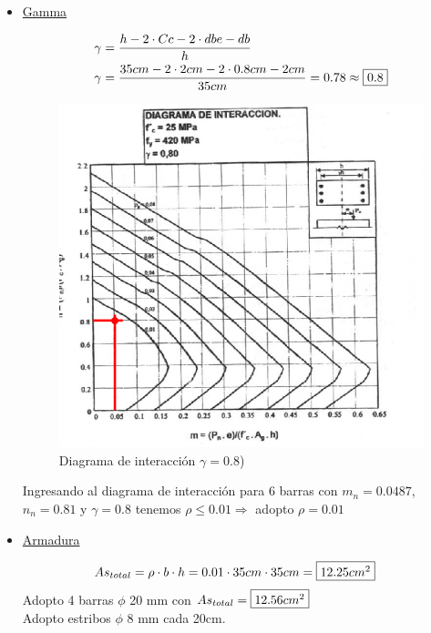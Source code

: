 \begin{enumerate}
\begin{itemize}
\item \underline{Gamma}

\begin{align*}
& \gamma = \frac{h - 2 \cdot Cc - 2 \cdot dbe - db}{h} \\
& \gamma = \frac{35cm - 2 \cdot 2cm - 2 \cdot 0.8cm - 2cm}{35cm} = 0.78 \approx \framebox{0.8}
\end{align*}

\begin{figure}[H]
\begin{center}
	 \includegraphics[scale = 0.9]{chapters/chapter_1/images/figura2.png}
     \caption{Diagrama de interacción $\gamma = 0.8$)}
\end{center}
\end{figure}
Ingresando al diagrama de interacción para 6 barras con $m_{n}=0.0487$, $n_{n}=0.81$ y $\gamma = 0.8$ tenemos $\rho \leq 0.01 \Rightarrow$ adopto $\rho=0.01$

\item \underline{Armadura}

\begin{align*}
& As_{total} = \rho \cdot b \cdot h = 0.01 \cdot 35cm \cdot 35cm = \framebox{$12.25cm^2$}
\end{align*}
Adopto 4 barras $\phi$ 20 mm con $As_{total}=\framebox{$12.56cm^2$}$\\
Adopto estribos $\phi$ 8 mm cada 20cm.\\


\end{itemize}
\end{enumerate}
